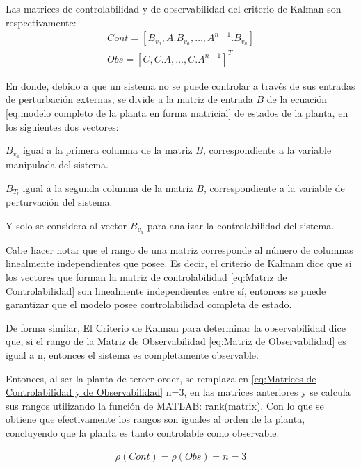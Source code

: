 \documentclass{article}
\begin{document}
\begin{sloppypar}
Las matrices de controlabilidad y de observabilidad del criterio de Kalman son respectivamente:
\begin{subequations} \label{eq:Matrices de Controlabilidad y de Observabilidad}
	\begin{align}
        \label{eq:Matriz de Controlabilidad} Cont=\left[B_{v_a},A.B_{v_a},\ldots,A^{n-1}.B_{v_a}\right]
        \\
        \label{eq:Matriz de Observabilidad} Obs=\left[C,C.A,\ldots,C.A^{n-1}\right]^T
	\end{align}
\end{subequations}

En donde, debido a que un sistema no se puede controlar a través de sus entradas de perturbación externas, se divide a la matriz de entrada $B$ de la ecuación \ref{eq:modelo completo de la planta en forma matricial} de estados de la planta, en los siguientes dos vectores:
\begin{description}
    \item $B_{v_a}$ igual a la primera columna de la matriz $B$, correspondiente a la variable manipulada del sistema.
    \item $B_{T_l}$ igual a la segunda columna de la matriz $B$, correspondiente a la variable de perturvación del sistema.
\end{description}
Y solo se considera al vector $B_{v_a}$ para analizar la controlabilidad del sistema.

Cabe hacer notar que el rango de una matriz corresponde al número de columnas linealmente independientes que posee. Es decir, el criterio de Kalmam dice que si los vectores que forman la matriz de controlabilidad \ref{eq:Matriz de Controlabilidad} son linealmente independientes entre sí, entonces se puede garantizar que el modelo posee controlabilidad completa de estado.

De forma similar, El Criterio de Kalman para determinar la observabilidad dice que, si el rango de la Matriz de Observabilidad \ref{eq:Matriz de Observabilidad} es igual a n, entonces el sistema es completamente observable.

Entonces, al ser la planta de tercer order, se remplaza en \ref{eq:Matrices de Controlabilidad y de Observabilidad} n=3, en las matrices anteriores y se calcula sus rangos utilizando la función de MATLAB: rank(matrix). Con lo que se obtiene que efectivamente los rangos son iguales al orden de la planta, concluyendo que la planta es tanto controlable como observable.

\begin{align} \label{eq:Rangos de las Matrices de Controlabilidad y de Observabilidad}
    \rho(Cont)=\rho(Obs)=n=3
\end{align}


\end{sloppypar}
\end{document}
